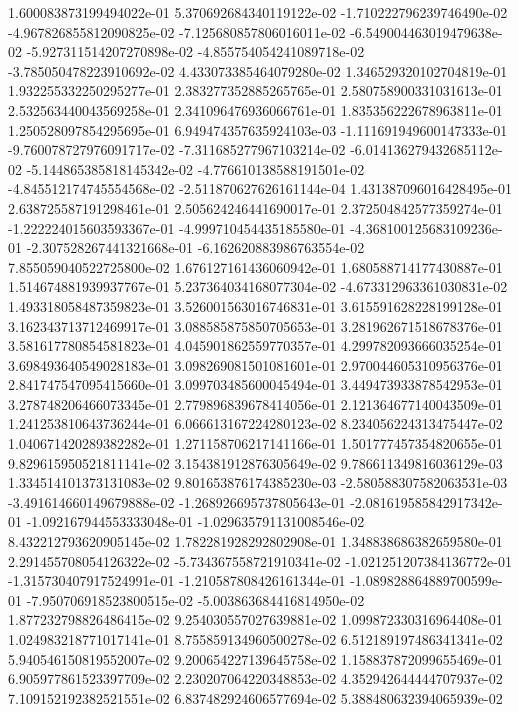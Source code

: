 1.600083873199494022e-01
5.370692684340119122e-02
-1.710222796239746490e-02
-4.967826855812090825e-02
-7.125680857806016011e-02
-6.549004463019479638e-02
-5.927311514207270898e-02
-4.855754054241089718e-02
-3.785050478223910692e-02
4.433073385464079280e-02
1.346529320102704819e-01
1.932255332250295277e-01
2.383277352885265765e-01
2.580758900331031613e-01
2.532563440043569258e-01
2.341096476936066761e-01
1.835356222678963811e-01
1.250528097854295695e-01
6.949474357635924103e-03
-1.111691949600147333e-01
-9.760078727976091717e-02
-7.311685277967103214e-02
-6.014136279432685112e-02
-5.144865385818145342e-02
-4.776610138588191501e-02
-4.845512174745554568e-02
-2.511870627626161144e-04
1.431387096016428495e-01
2.638725587191298461e-01
2.505624246441690017e-01
2.372504842577359274e-01
-1.222224015603593367e-01
-4.999710454435185580e-01
-4.368100125683109236e-01
-2.307528267441321668e-01
-6.162620883986763554e-02
7.855059040522725800e-02
1.676127161436060942e-01
1.680588714177430887e-01
1.514674881939937767e-01
5.237364034168077304e-02
-4.673312963361030831e-02
1.493318058487359823e-01
3.526001563016746831e-01
3.615591628228199128e-01
3.162343713712469917e-01
3.088585875850705653e-01
3.281962671518678376e-01
3.581617780854581823e-01
4.045901862559770357e-01
4.299782093666035254e-01
3.698493640549028183e-01
3.098269081501081601e-01
2.970044605310956376e-01
2.841747547095415660e-01
3.099703485600045494e-01
3.449473933878542953e-01
3.278748206466073345e-01
2.779896839678414056e-01
2.121364677140043509e-01
1.241253810643736244e-01
6.066613167224280123e-02
8.234056224313475447e-02
1.040671420289382282e-01
1.271158706217141166e-01
1.501777457354820655e-01
9.829615950521811141e-02
3.154381912876305649e-02
9.786611349816036129e-03
1.334514101373131083e-02
9.801653876174385230e-03
-2.580588307582063531e-03
-3.491614660149679888e-02
-1.268926695737805643e-01
-2.081619585842917342e-01
-1.092167944553333048e-01
-1.029635791131008546e-02
8.432212793620905145e-02
1.782281928292802908e-01
1.348838686382659580e-01
2.291455708054126322e-02
-5.734367558721910341e-02
-1.021251207384136772e-01
-1.315730407917524991e-01
-1.210587808426161344e-01
-1.089828864889700599e-01
-7.950706918523800515e-02
-5.003863684416814950e-02
1.877232798826486415e-02
9.254030557027639881e-02
1.099872330316964408e-01
1.024983218771017141e-01
8.755859134960500278e-02
6.512189197486341341e-02
5.940546150819552007e-02
9.200654227139645758e-02
1.158837872099655469e-01
6.905977861523397709e-02
2.230207064220348853e-02
4.352942644444707937e-02
7.109152192382521551e-02
6.837482924606577694e-02
5.388480632394065939e-02

